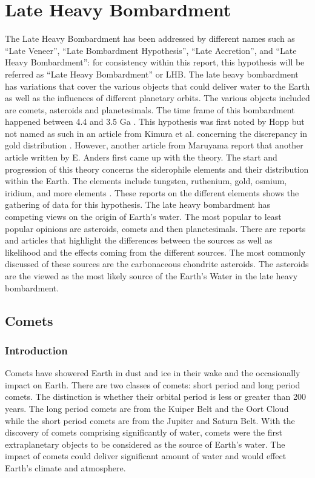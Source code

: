 \documentclass{article}
\begin{document}
\section{Late Heavy Bombardment}
The Late Heavy Bombardment has been addressed by different names such as “Late Veneer”, “Late Bombardment Hypothesis”, “Late Accretion”, and “Late Heavy Bombardment”: for consistency within this report, this hypothesis will be referred as “Late Heavy Bombardment” or LHB. The late heavy bombardment has variations that cover the various objects that could deliver water to the Earth as well as the influences of different planetary orbits. The various objects included are comets, asteroids and planetesimals. The time frame of this bombardment happened between 4.4 and 3.5 Ga \cite{LHB_Timeframe}. This hypothesis was first noted by Hopp\cite{BOMB1} but not named as such in an article from Kimura et al. concerning the discrepancy in gold distribution \cite{BOMB2}. However, another article from Maruyama \cite{BOMB3} report that another article written by E. Anders \cite{BOMB4} first came up with the theory. The start and progression of this theory concerns the siderophile elements and their distribution within the Earth. The elements include tungsten, ruthenium, gold, osmium, iridium, and more elements \cite{BOMB5} \cite{BOMB6} \cite{BOMB7}. These reports on the different elements shows the gathering of data for this hypothesis. The late heavy bombardment has competing views on the origin of Earth’s water. The most popular to least popular opinions are asteroids, comets and then planetesimals. There are reports and articles \cite{BOMB8} \cite{BOMB9} \cite{BOMB10} that highlight the differences between the sources as well as likelihood and the effects coming from the different sources. The most commonly discussed of these sources are the carbonaceous chondrite asteroids. The asteroids are the viewed as the most likely source of the Earth’s Water in the late heavy bombardment.

\subsection{Comets}

\subsubsection{Introduction}
Comets have showered Earth in dust and ice in their wake and the occasionally impact on Earth. 
There are two classes of comets: short period and long period comets. 
The distinction is whether their orbital period is less or greater than 200 years. 
The long period comets are from the Kuiper Belt and the Oort Cloud while the short period comets are from the Jupiter and Saturn Belt.
With the discovery of comets comprising significantly of water, comets were the first extraplanetary objects to be considered as the source of Earth's water. The impact of comets could deliver significant amount of water and would effect Earth's climate and atmosphere.
\end{document}
